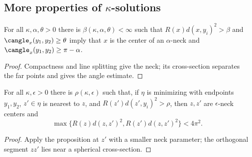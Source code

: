 \subsection{More properties of $\kappa$-solutions}
\begin{proposition}
\label{prop:kl-more-properties-solutions-existence-kappa-solutions}

\label{neckcrit}
For all $\kappa,\alpha,\theta>0$ there is $\beta(\kappa,\alpha,\theta)<\infty$
such that $R(x)d(x,y_i)^2>\beta$ and
$\cangle_x(y_1,y_2)\geq\theta$ imply that $x$ is the center of an
$\alpha$-neck and $\cangle_x(y_1,y_2)\geq\pi-\alpha$.
\end{proposition}
\begin{proof}
\sketch Compactness and line splitting give the neck; its cross-section
separates the far points and gives the angle estimate.
\end{proof}
\begin{corollary}
\label{cor:kl-more-properties-solutions-existence-kappa-solutions}

\label{longsegment}
For all $\kappa,\epsilon>0$ there is $\rho(\kappa,\epsilon)$ such that, if
$\eta$ is minimizing with endpoints $y_1,y_2$, $z'\in\eta$ is nearest to $z$,
and $R(z')d(z',y_i)^2>\rho$, then $z,z'$ are $\epsilon$-neck centers and
\[
\max\{R(z)d(z,z')^2,R(z')d(z,z')^2\}<4\pi^2.
\]
\end{corollary}
\begin{proof}
\sketch Apply the proposition at $z'$ with a smaller neck parameter; the
orthogonal segment $zz'$ lies near a spherical cross-section.
\end{proof}

